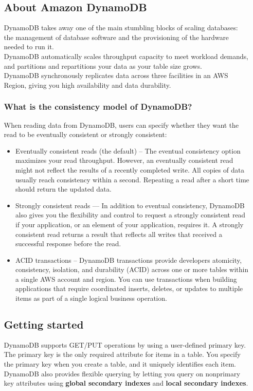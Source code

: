 \documentclass[12pt, letterpaper, twoside]{article}
\begin{document}
\subsection{About Amazon DynamoDB}
DynamoDB takes away one of the main stumbling blocks of scaling databases: the management of database software and 
the provisioning of the hardware needed to run it.\\
DynamoDB automatically scales throughput capacity to meet workload demands, and partitions and repartitions your 
data as your table size grows.\\
DynamoDB synchronously replicates data across three facilities in an AWS Region, giving you high availability 
and data durability.\\

\subsubsection{What is the consistency model of DynamoDB?}
When reading data from DynamoDB, users can specify whether they want the read to be eventually consistent or 
strongly consistent:
\begin{itemize}
	\item Eventually consistent reads (the default) – The eventual consistency option maximizes your read throughput. 
		However, an eventually consistent read might not reflect the results of a recently completed write. 
		All copies of data usually reach consistency within a second. Repeating a read after a short time should return the updated data.
	\item Strongly consistent reads — In addition to eventual consistency, DynamoDB also gives you the flexibility and control 
		to request a strongly consistent read if your application, or an element of your application, requires it. A strongly 
		consistent read returns a result that reflects all writes that received a successful response before the read.
	\item ACID transactions – DynamoDB transactions provide developers atomicity, consistency, isolation, and durability (ACID) 
		across one or more tables within a single AWS account and region. You can use transactions when building applications that 
		require coordinated inserts, deletes, or updates to multiple items as part of a single logical business operation.
\end{itemize}

\subsection{Getting started}
DynamoDB supports GET/PUT operations by using a user-defined primary key. The primary key is the only required 
attribute for items in a table. You specify the primary key when you create a table, and it uniquely identifies 
each item. DynamoDB also provides flexible querying by letting you query on nonprimary key attributes using 
\textbf{global secondary indexes} and \textbf{local secondary indexes}.\\
\end{document}
